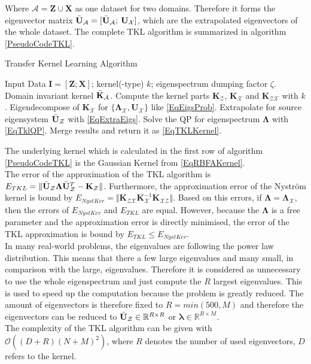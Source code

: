 Where $\mathcal{A}= \mathbf{Z} \cup \mathbf{X}$ as one dataset for two domains.
Therefore it forms the eigenvector matrix $ \bar{\mathbf{U}}_\mathcal{A} =[ \bar{\mathbf{U}}_\mathcal{A};\>  \mathbf{U}_\mathcal{X}]$, which are the extrapolated eigenvectors of the whole dataset.\newline
The complete \acs{TKL} algorithm is summarized in algorithm \ref{PseudoCodeTKL}.\cite{Long.2015}
\begin{algorithm}
	\caption{Transfer Kernel Learning Algorithm}\label{PseudoCodeTKL}	
	\begin{algorithmic}[1]
		\Require Input Data $\mathbf{I} = [\mathbf{Z};\mathbf{X}]$; kernel(-type) $k$; eigenspectrum dumping factor $\zeta$.
		\Ensure Domain invariant kernel $\bar{\mathbf{K}}_\mathcal{A}$.
		\State Compute the kernel parts $\mathbf{K}_\mathcal{Z}$, $\mathbf{K}_\mathcal{X}$ and $\mathbf{K}_\mathcal{ZX}$ with $k$.
		\State Eigendecompose of $\mathbf{K}_\mathcal{X}$ for $\{\mathbf{\Lambda}_\mathcal{X}, \mathbf{U}_\mathcal{X}\}$ like \eqref{EqEigsProb}.
		\State Extrapolate for source eigensystem  $\bar{\mathbf{U}}_\mathcal{Z}$ with \eqref{EqExtraEigs}.
		\State Solve the \acs{QP} for eigenspectrum $\mathbf{\Lambda}$ with \eqref{EqTklQP}.
		\State Merge results and return it as \eqref{EqTKLKernel}.
	\end{algorithmic}
\end{algorithm}
The underlying kernel which is calculated in the first row of algorithm \ref{PseudoCodeTKL} is the Gaussian Kernel from \eqref{EqRBFAKernel}.\\
The error of the approximation of the \acl{TKL} algorithm is $E_{TKL} = \Vert \bar{\mathbf{U}}_\mathcal{Z} \boldsymbol{\Lambda}\bar{\mathbf{U}}_\mathcal{Z}^T - \mathbf{K}_\mathcal{Z}\Vert$.
Furthermore, the approximation error of the Nyström kernel is bound by $E_{NystKer} = \Vert \mathbf{K}_{\mathcal{ZX}} \mathbf{K}_{\mathcal{X}}^{-1}\mathbf{K}_{\mathcal{XZ}}\Vert$.
Based on this errors, if $\boldsymbol{\Lambda} = \boldsymbol{\Lambda}_\mathcal{X}$, then the errors of $E_{NystKer}$ and $E_{TKL}$ are equal. 
However, because the $\boldsymbol{\Lambda}$ is a free parameter and the approximation error is directly minimised, the error of the \acs{TKL} approximation is bound by $E_{TKL}\le E_{NystKer}$.\cite{Long.}\\
In many real-world problems, the eigenvalues are following the power law distribution.
This means that there a few large eigenvalues and many small, in comparison with the large, eigenvalues.\cite{Mihail.2002}
Therefore it is considered as unnecessary to use the whole eigenspectrum and just compute the $R$ largest eigenvalues.
This is used to speed up the computation because the problem is greatly reduced.
The amount of eigenvectors is therefore fixed to $R=min(500,M)$ and therefore the eigenvectors can be reduced to $\bar{\mathbf{U}}_\mathcal{Z} \in \mathbb{R}^{R\times R}$ or $\mathbf{\lambda} \in \mathbb{R}^{R\times M}$.\cite{Long.}\\
The complexity of the \acs{TKL} algorithm can be given with $\mathcal{O}((D+R)(N+M)^2)$, where $R$ denotes the number of used eigenvectors, $D$ refers to the kernel.\cite{Long.}

